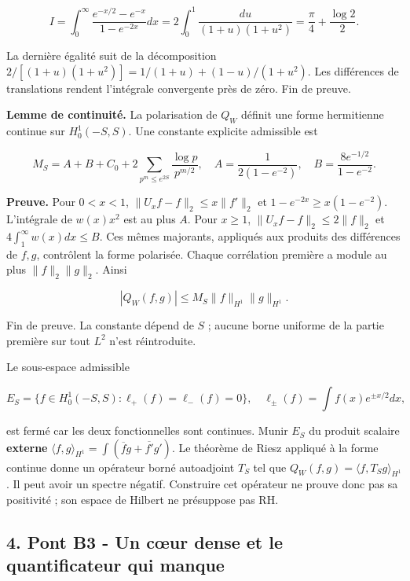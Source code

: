 \documentclass[
  10pt,
  a4paper,
]{article}
\begin{document}
\[
I=\int_0^\infty\frac{e^{-x/2}-e^{-x}}{1-e^{-2x}}dx
=2\int_0^1\frac{du}{(1+u)(1+u^2)}
=\frac\pi4+\frac{\log2}{2}.
\]

La dernière égalité suit de la décomposition
\(2/[(1+u)(1+u^2)]=1/(1+u)+(1-u)/(1+u^2)\). Les différences de
translations rendent l'intégrale convergente près de zéro. Fin de
preuve.

\textbf{Lemme de continuité.} La polarisation de \(Q_W\) définit une
forme hermitienne continue sur \(H_0^1(-S,S)\). Une constante explicite
admissible est

\[
M_S=A+B+C_0+2\sum_{p^m\le e^{2S}}\frac{\log p}{p^{m/2}},
\quad A=\frac1{2(1-e^{-2})},\quad B=\frac{8e^{-1/2}}{1-e^{-2}}.
\]

\textbf{Preuve.} Pour \(0<x<1\), \(\|U_xf-f\|_2\le x\|f'\|_2\) et
\(1-e^{-2x}\ge x(1-e^{-2})\). L'intégrale de \(w(x)x^2\) est au plus
\(A\). Pour \(x\ge1\), \(\|U_xf-f\|_2\le2\|f\|_2\) et
\(4\int_1^\infty w(x)dx\le B\). Ces mêmes majorants, appliqués aux
produits des différences de \(f,g\), contrôlent la forme polarisée.
Chaque corrélation première a module au plus \(\|f\|_2\|g\|_2\). Ainsi

\[
|Q_W(f,g)|\le M_S\|f\|_{H^1}\|g\|_{H^1}.
\]

Fin de preuve. La constante dépend de \(S\) ; aucune borne uniforme de
la partie première sur tout \(L^2\) n'est réintroduite.

Le sous-espace admissible

\[
E_S=\{f\in H_0^1(-S,S):\ell_+(f)=\ell_-(f)=0\},\quad
\ell_\pm(f)=\int f(x)e^{\pm x/2}dx,
\]

est fermé car les deux fonctionnelles sont continues. Munir \(E_S\) du
produit scalaire \textbf{externe}
\(\langle f,g\rangle_{H^1}=\int(\overline f g+\overline{f'}g')\). Le
théorème de Riesz appliqué à la forme continue donne un opérateur borné
autoadjoint \(T_S\) tel que \(Q_W(f,g)=\langle f,T_Sg\rangle_{H^1}\). Il
peut avoir un spectre négatif. Construire cet opérateur ne prouve donc
pas sa positivité ; son espace de Hilbert ne présuppose pas RH.

\newpage

\hypertarget{pont-b3---un-cux153ur-dense-et-le-quantificateur-qui-manque}{%
\subsection{4. Pont B3 - Un cœur dense et le quantificateur qui
manque}\label{pont-b3---un-cux153ur-dense-et-le-quantificateur-qui-manque}}
\end{document}

